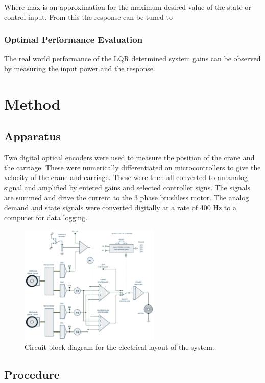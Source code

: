 \documentclass{article}
\begin{document}
Where max is an approximation for the maximum desired value of the state or control input.
From this the response can be tuned to 

\subsubsection{Optimal Performance Evaluation}

The real world performance of the LQR determined system gains can be observed by measuring the input power and the response.

\section{Method}

\subsection{Apparatus}

Two digital optical encoders were used to measure the position of the crane and the carriage.
These were numerically differentiated on microcontrollers to give the velocity of the crane and carriage.
These were then all converted to an analog signal and amplified by entered gains and selected controller signs.
The signals are summed and drive the current to the 3 phase brushless motor. 
The analog demand and state signals were converted digitally at a rate of 400 Hz to a computer for data logging. 

\begin{figure}[H]
  \centering
  \includegraphics[width=0.6\textwidth]{figures/electrical_layout.png}
  \caption{Circuit block diagram for the electrical layout of the system.}
  \label{fig:electrical_layout}
\end{figure}

\subsection{Procedure}
\end{document}
